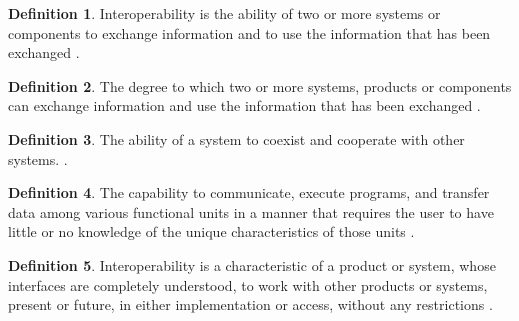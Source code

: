 \documentclass[letterpaper,cleveref]{lipics-v2019}
\theoremstyle{definition}
\newtheorem{defn}{Definition}
\begin{document}
\begin{defn}
	Interoperability is the ability of two or more systems or components to exchange
	information and to use the information that has been exchanged
	\citep{IEEEComputerDictionary1991}.
\end{defn}
\begin{defn}
	\label{InteroperabilitySelected}
	The degree to which two or more systems, products or components can exchange
	information and use the information that has been exchanged
	\citep{ISO/IEC25010}.
\end{defn}
\begin{defn}
	The ability of a system to coexist and cooperate with other systems.
	\citep{ghezzi1991fundamentals}.
\end{defn}
\begin{defn}
	The capability to communicate, execute programs, and transfer data among various
	functional units in a manner that requires the user to have little or no
	knowledge of the unique characteristics of those units
	\citep{ISO/IEC/IEEE24765}.
\end{defn}
\begin{defn}Interoperability is a characteristic of a product or system, whose
	interfaces are completely understood, to work with other products or systems,
	present or future, in either implementation or access, without any restrictions
	\citep{AFUL2019}.
\end{defn}
\end{document}

